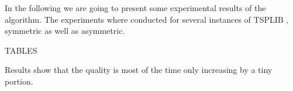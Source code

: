 In the following we are going to present some experimental results of the algorithm. The experiments where conducted for several instances of TSPLIB \cite{REINELT1995}, symmetric as well as asymmetric.

TABLES





Results show that the quality is most of the time only increasing by a tiny portion.